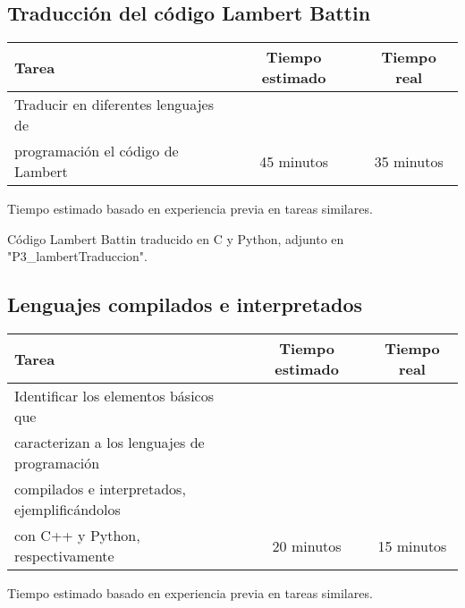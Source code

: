 \documentclass[12pt,a4paper]{article}
\begin{document}
\subsection{Traducción del código Lambert Battin}
    \begin{center}
        \begin{tabular}{|l|c|c|}
            \hline
            \textbf{Tarea} & \textbf{Tiempo estimado} & \textbf{Tiempo real} \\
            \hline
            Traducir en diferentes lenguajes de 
\\programación el código de Lambert & 45 minutos & 35 minutos \\
            \hline
        \end{tabular}
    \end{center}
    \begin{center}
        Tiempo estimado basado en experiencia previa en tareas similares.
    \end{center}
Código Lambert Battin traducido en C y Python, adjunto en "P3\_lambertTraduccion\/".

\subsection{Lenguajes compilados e interpretados}
    \begin{center}
        \begin{tabular}{|l|c|c|}
            \hline
            \textbf{Tarea} & \textbf{Tiempo estimado} & \textbf{Tiempo real} \\
            \hline
            Identificar los elementos básicos que 
\\caracterizan a los lenguajes de programación 
\\compilados e interpretados, ejemplificándolos 
\\con C++ y Python, respectivamente & 20 minutos & 15 minutos \\
            \hline
        \end{tabular}
    \end{center}
    \begin{center}
        Tiempo estimado basado en experiencia previa en tareas similares.
    \end{center}
\end{document}
